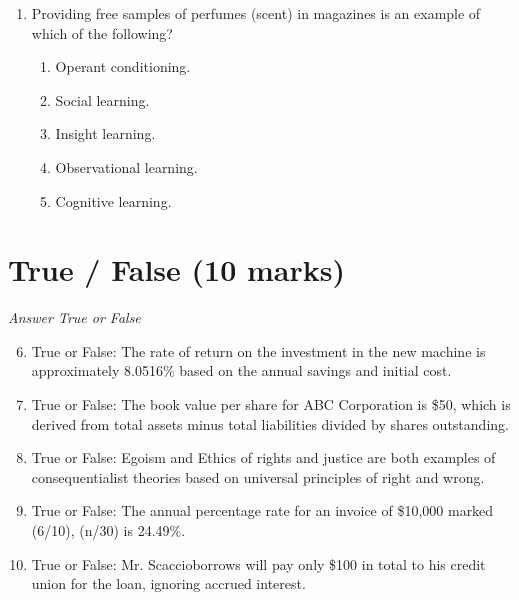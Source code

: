 \documentclass[12pt]{article}
\begin{document}
\begin{enumerate}[label=\arabic*.]
\begin{enumerate}[label=(\alph*)]
    \item Cultural influences
    \item Economic conditions
    \item Political situation
    \item Personality traits
\end{enumerate}
\item Providing free samples of perfumes (scent) in magazines is an example of which of the following?
\begin{enumerate}[label=(\alph*)]
    \item Operant conditioning.
    \item Social learning.
    \item Insight learning.
    \item Observational learning.
    \item Cognitive learning.
\end{enumerate}
\end{enumerate}

\section*{True / False (10 marks)}
\textit{Answer True or False}
\begin{enumerate}[label=\arabic*.]
\setcounter{enumi}{5}
\item True or False: The rate of return on the investment in the new machine is approximately 8.0516\% based on the annual savings and initial cost.
\item True or False: The book value per share for ABC Corporation is \$50, which is derived from total assets minus total liabilities divided by shares outstanding.
\item True or False: Egoism and Ethics of rights and justice are both examples of consequentialist theories based on universal principles of right and wrong.
\item True or False: The annual percentage rate for an invoice of \$10,000 marked (6/10), (n/30) is 24.49\%.
\item True or False: Mr. Scaccioborrows will pay only \$100 in total to his credit union for the loan, ignoring accrued interest.
\end{enumerate}
\end{document}
